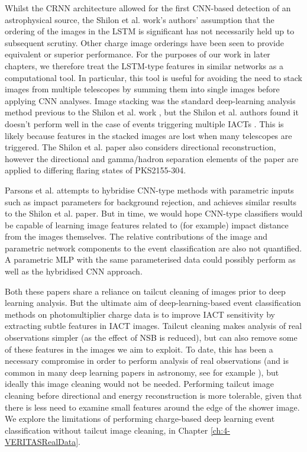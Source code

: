Whilst the CRNN architecture allowed for the first CNN-based detection of an astrophysical source, the Shilon et al. work's authors' assumption that the ordering of the images in the LSTM is significant has not necessarily held up to subsequent scrutiny. Other charge image orderings \cite{ariconf} have been seen to provide equivalent or superior performance. For the purposes of our work in later chapters, we therefore treat the LSTM-type features in similar networks as a computational tool. In particular, this tool is useful for avoiding the need to stack images from multiple telescopes by summing them into single images before applying CNN analyses. Image stacking was the standard deep-learning analysis method previous to the Shilon et al. work \cite{mangano}, but the Shilon et al. authors found it doesn't perform well in the case of events triggering multiple IACTs \cite{Shilon} \cite{salvatore}. This is likely because features in the stacked images are lost when many telescopes are triggered. The Shilon et al. paper also considers directional reconstruction, however the directional and gamma/hadron separation elements of the paper are applied to differing flaring states of PKS2155-304.

Parsons et al. \cite{ParsonsOhm} attempts to hybridise CNN-type methods with parametric inputs such as impact parameters for background rejection, and achieves similar results to the Shilon et al. paper. But in time, we would hope CNN-type classifiers would be capable of learning image features related to (for example) impact distance from the images themselves. The relative contributions of the image and parametric network components to the event classification are also not quantified. A parametric MLP with the same parameterised data could possibly perform as well as the hybridised CNN approach.

Both these papers share a reliance on tailcut cleaning of images prior to deep learning analysis. But the ultimate aim of deep-learning-based event classification methods on photomultiplier charge data is to improve IACT sensitivity by extracting subtle features in IACT images. Tailcut cleaning makes analysis of real observations simpler (as the effect of NSB is reduced), but can also remove some of these features in the images we aim to exploit. To date, this has been a necessary compromise in order to perform analysis of real observations (and is common in many deep learning papers in astronomy, see for example \cite{dodgygal}), but ideally this image cleaning would not be needed. Performing tailcut image cleaning before directional and energy reconstruction is more tolerable, given that there is less need to examine small features around the edge of the shower image. We explore the limitations of performing charge-based deep learning event classification without tailcut image cleaning, in Chapter \ref{ch:4-VERITASRealData}.

